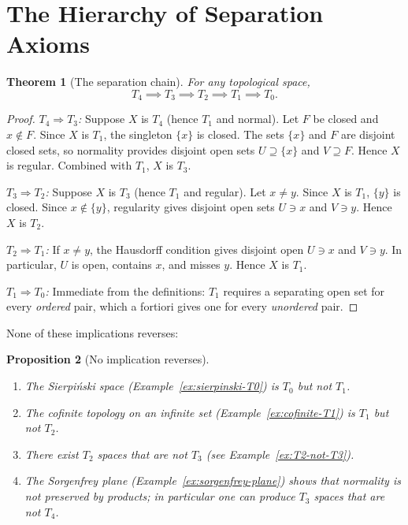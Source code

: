 \documentclass[11pt,a4paper,twoside]{book}
\newtheorem{theorem}{Theorem}[section]
\newtheorem{proposition}[theorem]{Proposition}
\theoremstyle{remark}
\theoremstyle{definition}
\theoremstyle{definition}
\begin{document}
\section{The Hierarchy of Separation Axioms}
\label{sec:separation-hierarchy}

\begin{theorem}[The separation chain]\label{thm:separation-chain}
For any topological space,
\[
  T_4 \implies T_3 \implies T_2 \implies T_1 \implies T_0.
\]
\end{theorem}

\begin{proof}
\emph{$T_4 \Rightarrow T_3$:}
Suppose $X$ is $T_4$ (hence $T_1$ and normal).  Let $F$ be closed and
$x \notin F$.  Since $X$ is $T_1$, the singleton $\{x\}$ is closed.
The sets $\{x\}$ and $F$ are disjoint closed sets, so normality provides
disjoint open sets $U \supseteq \{x\}$ and $V \supseteq F$.  Hence $X$ is
regular.  Combined with $T_1$, $X$ is $T_3$.

\emph{$T_3 \Rightarrow T_2$:}
Suppose $X$ is $T_3$ (hence $T_1$ and regular).  Let $x \neq y$.  Since $X$ is
$T_1$, $\{y\}$ is closed.  Since $x \notin \{y\}$, regularity gives disjoint
open sets $U \ni x$ and $V \ni y$.  Hence $X$ is $T_2$.

\emph{$T_2 \Rightarrow T_1$:}
If $x \neq y$, the Hausdorff condition gives disjoint open $U \ni x$ and
$V \ni y$.  In particular, $U$ is open, contains $x$, and misses $y$.  Hence
$X$ is $T_1$.

\emph{$T_1 \Rightarrow T_0$:}
Immediate from the definitions: $T_1$ requires a separating open set for every
\emph{ordered} pair, which a fortiori gives one for every \emph{unordered}
pair.
\end{proof}

None of these implications reverses:

\begin{proposition}[No implication reverses]\label{prop:no-reversal}
\leavevmode
\begin{enumerate}
\item The Sierpi\'nski space (Example~\ref{ex:sierpinski-T0}) is $T_0$ but
  not $T_1$.
\item The cofinite topology on an infinite set
  (Example~\ref{ex:cofinite-T1}) is $T_1$ but not $T_2$.
\item There exist $T_2$ spaces that are not $T_3$
  (see Example~\ref{ex:T2-not-T3}).
\item The Sorgenfrey plane (Example~\ref{ex:sorgenfrey-plane}) shows that
  normality is not preserved by products; in particular one can produce
  $T_3$ spaces that are not $T_4$.
\end{enumerate}
\end{proposition}
\end{document}
